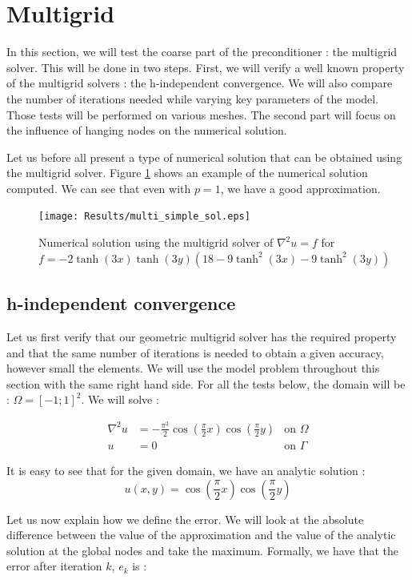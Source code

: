 \section{Multigrid}
In this section, we will test the coarse part of the preconditioner : the multigrid solver. This will be done in two steps. First, we will verify a well known property of the multigrid solvers : the h-independent convergence. We will also compare the number of iterations needed while varying key parameters of the model. Those tests will be performed on various meshes. The second part will focus on the influence of hanging nodes on the numerical solution. 

Let us before all present a type of numerical solution that can be obtained using the multigrid solver. Figure \ref{multi_simple_sol} shows an example of the numerical solution computed. We can see that even with $p=1$, we have a good approximation. 

\begin{figure}
\centering
\texttt{[image: Results/multi\_simple\_sol.eps]}
\caption{Numerical solution using the multigrid solver of $\nabla^2 u = f$ for $f = -2\tanh(3x)\tanh(3y)(18-9\tanh^2(3x)-9\tanh^2(3y))$}
\label{multi_simple_sol}
\end{figure}

\subsection{h-independent convergence}
Let us first verify that our geometric multigrid solver has the required property and that the same number of iterations is needed to obtain a given accuracy, however small the elements. We will use the model problem throughout this section with the same right hand side. For all the tests below, the domain  will be : $\Omega = [-1;1]^2$. We will solve : 

\begin{align}
\nabla^2 u &= -\frac{\pi^2}{2}\cos(\frac{\pi}{2}x)\cos(\frac{\pi}{2}y) &\text{on $\Omega$} \label{eq:prob1} \\
u &= 0  &\text{on $\Gamma$}
\end{align}

It is easy to see that for the given domain, we have an analytic solution : 
$$u(x,y) = \cos(\frac{\pi}{2}x)\cos(\frac{\pi}{2}y)$$ 


Let us now explain how we define the error. We will look at the absolute difference between the value of the approximation and the value of the analytic solution at the global nodes and take the maximum. Formally, we have that the error after iteration $k$, $e_k$ is :

